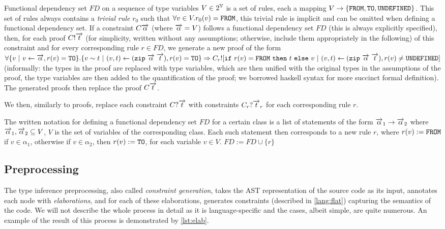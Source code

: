 \begin{description}
    Functional dependency set $FD$ on a sequence of type variables $V \in 2^{\mathbb{V}}$ is a set of rules, each a mapping $V \to \{\mathtt{FROM}, \mathtt{TO}, \mathtt{UNDEFINED}\}$. This set of rules always contains a \emph{trivial rule} $r_0$ such that $\forall v \in V . r_0(v) = \mathtt{FROM}$, this trivial rule is implicit and can be omitted when defining a functional dependency set. If a constraint $C \overrightarrow{\alpha}$ (where $\overrightarrow{\alpha} = V$) follows a functional dependency set $FD$ (this is always explicitly specified), then, for each proof $C! \overrightarrow{t}$ (for simplicity, written without any assumptions; otherwise, include them appropriately in the following) of this constraint and for every corresponding rule $r \in FD$, we generate a new proof of the form $\forall \{v \ |\  v \gets \overrightarrow{\alpha}, r(v) = \mathtt{TO}\} . \{v \sim t \ |\  (v, t) \gets (\mathtt{zip}\ \overrightarrow{\alpha}\ \overrightarrow{t}), r(v) = \mathtt{TO} \} \Rightarrow C_r! [\mathtt{if}\ r(v) = \mathtt{FROM}\ \mathtt{then}\ t\ \mathtt{else}\ v \ |\  (v, t) \gets (\mathtt{zip}\ \overrightarrow{\alpha}\ \overrightarrow{t}), r(v) \neq \mathtt{UNDEFINED}]$ (informally: the  types in the proof are replaced with type variables, which are then unified with the original types in the assumptions of the proof, the type variables are then added to the quantification of the proof; we borrowed haskell syntax for more succinct formal definition). The generated proofs then replace the proof $C \overrightarrow{t}$.

    We then, similarly to proofs, replace each constraint $C? \overrightarrow{t}$ with constraints $C_r? \overrightarrow{t}_r$ for each corresponding rule $r$.

    The written notation for defining a functional dependency set $FD$ for a certain class is a list of statements of the form $\overrightarrow{\alpha}_1 \to \overrightarrow{\alpha}_2$ where $\overrightarrow{\alpha}_1, \overrightarrow{\alpha}_2 \subseteq V$, $V$ is the set of variables of the corresponding class. Each such statement then corresponds to a new rule $r$, where $r(v) := \mathtt{FROM}$ if $v \in \alpha_1$, otherwise if $v \in \alpha_2$, then $r(v) := \mathtt{TO}$, for each variable $v \in V$. $FD := FD \cup \{r\}$

\end{description}

\subsection{Preprocessing}
\label{preprocessing}

The type inference preprocessing, also called \emph{constraint generation}, takes the AST representation of the source code as its input, annotates each node with \emph{elaborations}, and for each of these elaborations, generates constraints (described in \cref{lang:flat}) capturing the semantics of the code. We will not describe the whole process in detail as it is language-specific and the cases, albeit simple, are quite numerous. An example of the result of this process is demonstrated by \cref{lst:elab}.

